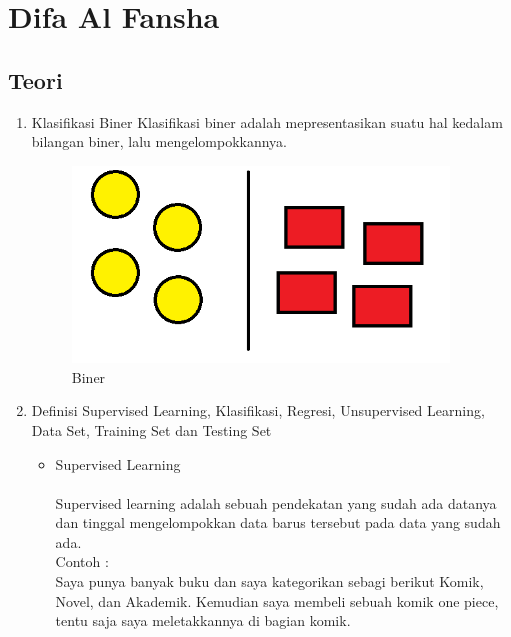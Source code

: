 \section{Difa Al Fansha}
\subsection{Teori}

\begin{enumerate}

	\item Klasifikasi Biner
		Klasifikasi biner adalah mepresentasikan suatu hal kedalam bilangan biner, lalu mengelompokkannya.
		
			\begin{figure}[H]
				\begin{center}
				 \includegraphics[width=10cm]{figures/1174076/figures2/1.png}
				 \caption{Biner}	
				\end{center}
			\end{figure}
		
	\item Definisi Supervised Learning, Klasifikasi, Regresi, Unsupervised Learning, Data Set, Training Set dan Testing Set
		
		\begin{itemize}
			\item Supervised Learning
				\paragraph{}
				Supervised learning adalah sebuah pendekatan yang sudah ada datanya dan tinggal mengelompokkan data barus tersebut pada data yang sudah ada.\\
				
				Contoh :\\
				Saya punya banyak buku dan saya kategorikan sebagi berikut Komik, Novel, dan Akademik.
				Kemudian saya membeli sebuah komik one piece, tentu saja saya meletakkannya di bagian komik.
	

\end{itemize}
\end{enumerate}
